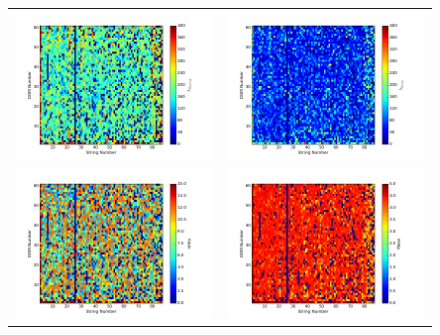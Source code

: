 \begin{figure}[h]
\centering
\begin{tabular}{cc}
  	\includegraphics[width=0.5\linewidth]{thermal_occupancy.png} &
	\includegraphics[width=0.5\linewidth]{decay_occupancy.png} \\

  	\includegraphics[width=0.5\linewidth]{nhits_occupancy.png} &
	\includegraphics[width=0.5\linewidth]{mean_occupancy.png} \\


\end{tabular}
\end{figure}
